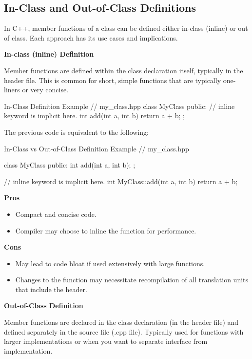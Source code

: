 \subsection{In-Class and Out-of-Class Definitions}

In C++, member functions of a class can be defined either in-class (inline) or out of class. Each approach has its use cases and implications.

\textbf{In-class (inline) Definition}

Member functions are defined within the class declaration itself, typically in the header file. This is common for short, simple functions that are typically one-liners or very concise.

\begin{neonlisting}[language=C++]{In-Class Definition Example}
// my\_class.hpp
class MyClass {
public:
    // inline keyword is implicit here.
    int add(int a, int b) {
        return a + b;
    }
};
\end{neonlisting}

The previous code is equivalent to the following:

\begin{neonlisting}[language=C++]{In-Class vs Out-of-Class Definition Example}
// my\_class.hpp

class MyClass {
public:
    int add(int a, int b);
};

// inline keyword is implicit here.
int MyClass::add(int a, int b) {
    return a + b;
}
\end{neonlisting}

\textbf{Pros}

\begin{itemize}
    \item Compact and concise code.
    \item Compiler may choose to inline the function for performance.
\end{itemize}

\textbf{Cons}

\begin{itemize}
    \item May lead to code bloat if used extensively with large functions.
    \item Changes to the function may necessitate recompilation of all translation units that include the header.
\end{itemize}

\textbf{Out-of-Class Definition}

Member functions are declared in the class declaration (in the header file) and defined separately in the source file (.cpp file). Typically used for functions with larger implementations or when you want to separate interface from implementation.

